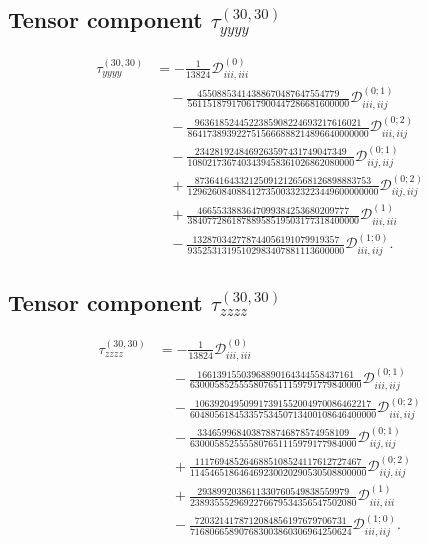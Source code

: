 \documentclass[aip,jcp,reprint]{revtex4-2}
\begin{document}
\begin{widetext}
\subsection{Tensor component $\tau^{(30,30)}_{yyyy}$}

\begin{equation}
\begin{aligned}
\tau^{(30,30)}_{yyyy} &=
-\frac{1}{13824}\mathcal{D}^{(0)}_{iii,iii}
\\
&\quad
- \frac{45508853414388670487647554779}
       {561151879170617900447286681600000}
  \mathcal{D}^{(0;1)}_{iii,iij}
\\
&\quad
- \frac{9636185244522385908224693217616021}
       {8641738939227515666888214896640000000}
  \mathcal{D}^{(0;2)}_{iii,iij}
\\
&\quad
- \frac{2342819248469263597431749047349}
       {1080217367403439458361026862080000}
  \mathcal{D}^{(0;1)}_{iij,iij}
\\
&\quad
+ \frac{873641643321250912126568126898883753}
       {129626084088412735003323223449600000000}
  \mathcal{D}^{(0;2)}_{iij,iij}
\\
&\quad
+ \frac{4665533883647099384253680209777}
       {38407728618788958519503177318400000}
  \mathcal{D}^{(1)}_{iii,iii}
\\
&\quad
- \frac{132870342778744056191079919357}
       {93525313195102983407881113600000}
  \mathcal{D}^{(1;0)}_{iii,iij}.
\end{aligned}
\end{equation}

\subsection{Tensor component $\tau^{(30,30)}_{zzzz}$}

\begin{equation}
\begin{aligned}
\tau^{(30,30)}_{zzzz} &=
-\frac{1}{13824}\mathcal{D}^{(0)}_{iii,iii}
\\
&\quad
- \frac{16613915503968890164344558437161}
       {63000585255558076511159791779840000}
  \mathcal{D}^{(0;1)}_{iii,iij}
\\
&\quad
- \frac{106392049509917391552004970086462217}
       {60480561845335753450713400108646400000}
  \mathcal{D}^{(0;2)}_{iii,iij}
\\
&\quad
- \frac{3346599684038788746878574958109}
       {6300058525555807651115979177984000}
  \mathcal{D}^{(0;1)}_{iij,iij}
\\
&\quad
+ \frac{1117694852646885108524117612727467}
       {114546518646469230020290530508800000}
  \mathcal{D}^{(0;2)}_{iij,iij}
\\
&\quad
+ \frac{2938992038611330760549838559979}
       {2389355529692276679534356547502080}
  \mathcal{D}^{(1)}_{iii,iii}
\\
&\quad
- \frac{7203214178712084856197679706731}
       {716806658907683003860306964250624}
  \mathcal{D}^{(1;0)}_{iii,iij}.
\end{aligned}
\end{equation}


\end{widetext}
\end{document}
